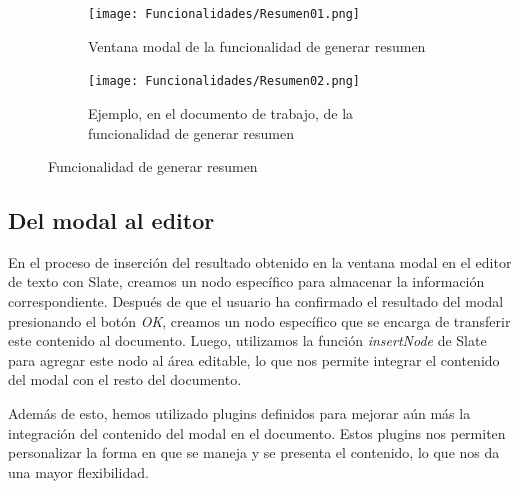 \begin{figure}[ht!]
  \centering
  \begin{subfigure}{\textwidth}
    \centering
    \texttt{[image: Funcionalidades/Resumen01.png]}
    \caption{Ventana modal de la funcionalidad de generar resumen}
    \label{fig:impresumen01}
  \end{subfigure}

  \begin{subfigure}{\textwidth}
    \centering
    \texttt{[image: Funcionalidades/Resumen02.png]}
    \caption{Ejemplo, en el documento de trabajo, de la funcionalidad de generar resumen}
    \label{fig:impresumen02}
  \end{subfigure}

  \caption{Funcionalidad de generar resumen}
  \label{fig:impresumen}
\end{figure}

\subsection{Del modal al editor}
En el proceso de inserción del resultado obtenido en la ventana modal en el editor de texto con Slate, creamos un nodo específico para almacenar la información correspondiente. Después de que el usuario ha confirmado el resultado del modal presionando el botón \textit{OK}, creamos un nodo específico que se encarga de transferir este contenido al documento. Luego, utilizamos la función \textit{insertNode} de Slate para agregar este nodo al área editable, lo que nos permite integrar el contenido del modal con el resto del documento.

Además de esto, hemos utilizado plugins definidos para mejorar aún más la integración del contenido del modal en el documento. Estos plugins nos permiten personalizar la forma en que se maneja y se presenta el contenido, lo que nos da una mayor flexibilidad.

